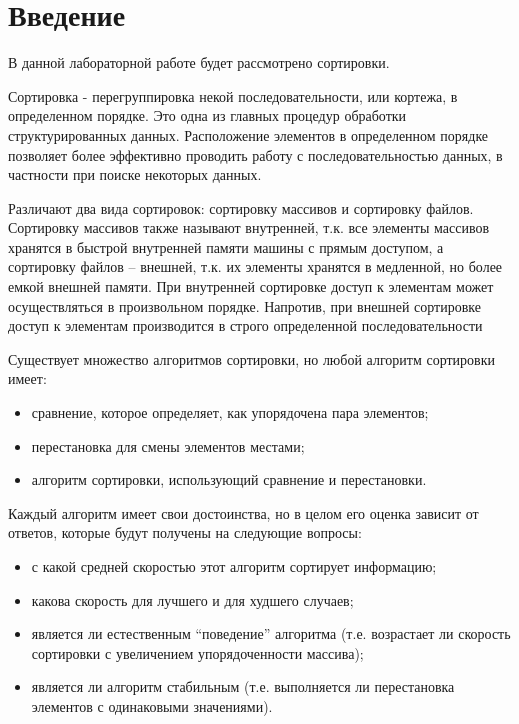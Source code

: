 \chapter*{Введение}

В данной лабораторной работе будет рассмотрено сортировки. 

Сортировка - перегруппировка некой последовательности, или кортежа, в определенном порядке. Это одна из главных процедур обработки структурированных данных. Расположение элементов в определенном порядке позволяет более эффективно проводить работу с последовательностью данных, в частности при поиске некоторых данных.

Различают два вида сортировок: сортировку массивов и сортировку файлов. Сортировку массивов также называют внутренней, т.к. все элементы массивов хранятся в быстрой внутренней памяти машины с прямым доступом, а сортировку файлов – внешней, т.к. их элементы хранятся в медленной, но более емкой внешней памяти. При внутренней сортировке доступ к элементам может осуществляться в
произвольном порядке. Напротив, при внешней сортировке доступ к элементам производится в строго определенной последовательности

Существует множество алгоритмов сортировки, но любой алгоритм сортировки имеет:
\begin{itemize}
	\item сравнение, которое определяет, как упорядочена пара элементов;
	\item перестановка для смены элементов местами;
	\item алгоритм сортировки, использующий сравнение и перестановки.
\end{itemize}

Каждый алгоритм имеет свои достоинства, но в целом его оценка зависит от ответов, которые будут получены на следующие вопросы:
\begin{itemize}
	\item с какой средней скоростью этот алгоритм сортирует информацию;
	\item какова скорость для лучшего и для худшего случаев;
	\item является ли естественным “поведение” алгоритма (т.е. возрастает ли скорость сортировки с увеличением упорядоченности массива);
	\item является ли алгоритм стабильным (т.е. выполняется ли перестановка элементов с одинаковыми значениями).
\end{itemize}

